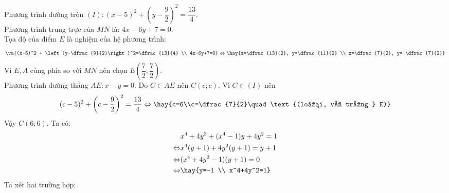 Phương trình đường tròn $(I): (x-5)^2 + \left(y-\dfrac{9}{2}\right)^2=\dfrac{13}{4}$.\\
Phương trình trung trực của $MN$ là: $4x-6y+7=0$.\\
Tọa độ của điểm $E$ là nghiệm của hệ phương trình:
$$\va{(x-5)^2 + \left(y-\dfrac{9}{2}\right)^2=\dfrac{13}{4} \\ 4x-6y+7=0} \Leftrightarrow \hay{x=\dfrac{13}{2}, y=\dfrac{11}{2} \\ x=\dfrac{7}{2}, y= \dfrac{7}{2}}$$
Vì $E, A$ cùng phía so với $MN$ nên chọn $E\left(\dfrac{7}{2};\dfrac{7}{2}\right)$.\\
Phương trình đường thẳng $AE:x-y=0$. Do $C\in AE$ nên $C(c;c)$. Vì $C\in (I)$ nên 
$$(c-5)^2 + \left(c-\dfrac{9}{2}\right)^2=\dfrac{13}{4} \Leftrightarrow \hay{c=6\\c=\dfrac{7}{2}\quad \text{(loại, vì trùng } E)}$$
Vậy $C(6;6)$.
\lgi
Ta có:
\begin{align*}
& x^4+4y^3+(x^4-1)y+4y^2=1 \\
\Leftrightarrow & x^4(y+1) + 4y^2(y+1) = y +1 \\
\Leftrightarrow & (x^4+4y^2-1)(y+1) = 0 \\
\Leftrightarrow & \hay{y=-1 \\ x^4+4y^2=1}
\end{align*}
Ta xét hai trường hợp:

